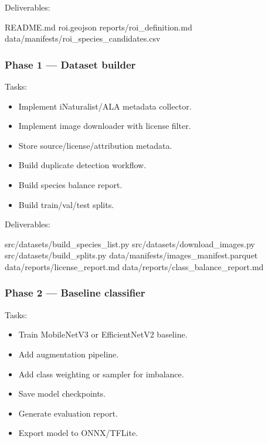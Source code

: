 \documentclass[
  11pt,
]{article}
\newenvironment{Shaded}{}{}
\newcommand{\NormalTok}[1]{#1}
\providecommand{\tightlist}{%
  \setlength{\itemsep}{0pt}\setlength{\parskip}{0pt}}
\begin{document}
Deliverables:

\begin{Shaded}
\begin{Highlighting}[]
\NormalTok{README.md}
\NormalTok{roi.geojson}
\NormalTok{reports/roi\_definition.md}
\NormalTok{data/manifests/roi\_species\_candidates.csv}
\end{Highlighting}
\end{Shaded}

\subsubsection{Phase 1 --- Dataset
builder}\label{phase-1-dataset-builder}

Tasks:

\begin{itemize}
\tightlist
\item[$\square$]
  Implement iNaturalist/ALA metadata collector.
\item[$\square$]
  Implement image downloader with license filter.
\item[$\square$]
  Store source/license/attribution metadata.
\item[$\square$]
  Build duplicate detection workflow.
\item[$\square$]
  Build species balance report.
\item[$\square$]
  Build train/val/test splits.
\end{itemize}

Deliverables:

\begin{Shaded}
\begin{Highlighting}[]
\NormalTok{src/datasets/build\_species\_list.py}
\NormalTok{src/datasets/download\_images.py}
\NormalTok{src/datasets/build\_splits.py}
\NormalTok{data/manifests/images\_manifest.parquet}
\NormalTok{data/reports/license\_report.md}
\NormalTok{data/reports/class\_balance\_report.md}
\end{Highlighting}
\end{Shaded}

\subsubsection{Phase 2 --- Baseline
classifier}\label{phase-2-baseline-classifier}

Tasks:

\begin{itemize}
\tightlist
\item[$\square$]
  Train MobileNetV3 or EfficientNetV2 baseline.
\item[$\square$]
  Add augmentation pipeline.
\item[$\square$]
  Add class weighting or sampler for imbalance.
\item[$\square$]
  Save model checkpoints.
\item[$\square$]
  Generate evaluation report.
\item[$\square$]
  Export model to ONNX/TFLite.
\end{itemize}
\end{document}
